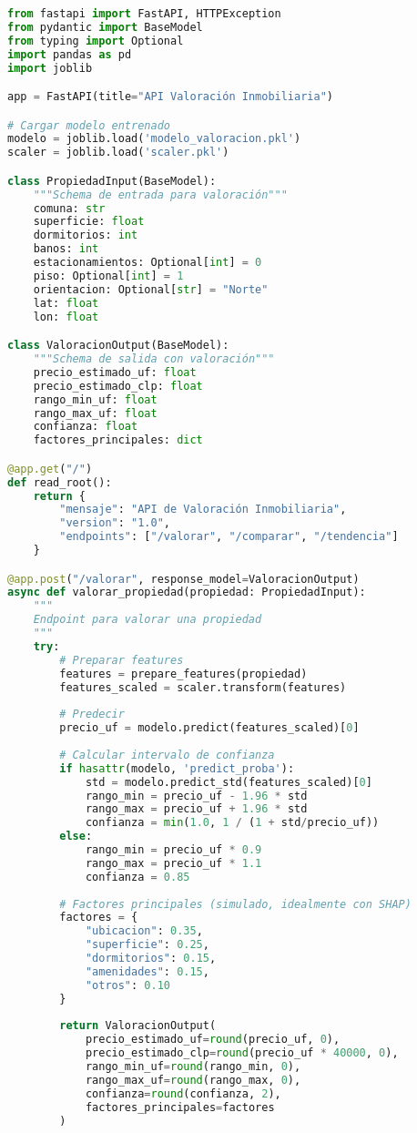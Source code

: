 \documentclass[11pt,a4paper]{article}
\begin{document}
\begin{lstlisting}[language=Python]
from fastapi import FastAPI, HTTPException
from pydantic import BaseModel
from typing import Optional
import pandas as pd
import joblib

app = FastAPI(title="API Valoración Inmobiliaria")

# Cargar modelo entrenado
modelo = joblib.load('modelo_valoracion.pkl')
scaler = joblib.load('scaler.pkl')

class PropiedadInput(BaseModel):
    """Schema de entrada para valoración"""
    comuna: str
    superficie: float
    dormitorios: int
    banos: int
    estacionamientos: Optional[int] = 0
    piso: Optional[int] = 1
    orientacion: Optional[str] = "Norte"
    lat: float
    lon: float

class ValoracionOutput(BaseModel):
    """Schema de salida con valoración"""
    precio_estimado_uf: float
    precio_estimado_clp: float
    rango_min_uf: float
    rango_max_uf: float
    confianza: float
    factores_principales: dict

@app.get("/")
def read_root():
    return {
        "mensaje": "API de Valoración Inmobiliaria",
        "version": "1.0",
        "endpoints": ["/valorar", "/comparar", "/tendencia"]
    }

@app.post("/valorar", response_model=ValoracionOutput)
async def valorar_propiedad(propiedad: PropiedadInput):
    """
    Endpoint para valorar una propiedad
    """
    try:
        # Preparar features
        features = prepare_features(propiedad)
        features_scaled = scaler.transform(features)
        
        # Predecir
        precio_uf = modelo.predict(features_scaled)[0]
        
        # Calcular intervalo de confianza
        if hasattr(modelo, 'predict_proba'):
            std = modelo.predict_std(features_scaled)[0]
            rango_min = precio_uf - 1.96 * std
            rango_max = precio_uf + 1.96 * std
            confianza = min(1.0, 1 / (1 + std/precio_uf))
        else:
            rango_min = precio_uf * 0.9
            rango_max = precio_uf * 1.1
            confianza = 0.85
        
        # Factores principales (simulado, idealmente con SHAP)
        factores = {
            "ubicacion": 0.35,
            "superficie": 0.25,
            "dormitorios": 0.15,
            "amenidades": 0.15,
            "otros": 0.10
        }
        
        return ValoracionOutput(
            precio_estimado_uf=round(precio_uf, 0),
            precio_estimado_clp=round(precio_uf * 40000, 0),
            rango_min_uf=round(rango_min, 0),
            rango_max_uf=round(rango_max, 0),
            confianza=round(confianza, 2),
            factores_principales=factores
        )
        

\end{lstlisting}
\end{document}
